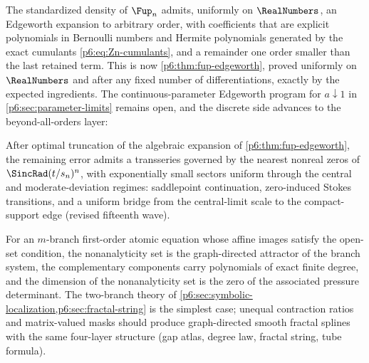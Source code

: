 \documentclass[11pt,oneside]{article}
\numberwithin{equation}{section}
\theoremstyle{definition}
\theoremstyle{remark}
\begin{document}
\begin{conjecture}
The standardized density of $\Fup_n$ admits, uniformly on $\RealNumbers$, an Edgeworth
expansion to arbitrary order, with coefficients that are explicit polynomials
in Bernoulli numbers and Hermite polynomials generated by the exact cumulants
\eqref{p6:eq:Zn-cumulants}, and a remainder one order smaller than the last
retained term.
This is now \cref{p6:thm:fup-edgeworth}, proved uniformly on $\RealNumbers$ and after
any fixed number of differentiations, exactly by the expected ingredients.
The continuous-parameter Edgeworth program for $a\downarrow1$ in
\cref{p6:sec:parameter-limits} remains open, and the discrete side advances
to the beyond-all-orders layer:
\end{conjecture}

\begin{conjecture}
After optimal truncation of the algebraic expansion of
\cref{p6:thm:fup-edgeworth}, the remaining error admits a transseries
governed by the nearest nonreal zeros of $\SincRad(t/s_n)^n$, with exponentially
small sectors uniform through the central and moderate-deviation regimes:
saddlepoint continuation, zero-induced Stokes transitions, and a uniform
bridge from the central-limit scale to the compact-support edge (revised
fifteenth wave).
\end{conjecture}

\begin{conjecture}
For an $m$-branch first-order atomic equation whose affine images satisfy the
open-set condition, the nonanalyticity set is the graph-directed attractor of
the branch system, the complementary components carry polynomials of exact
finite degree, and the dimension of the nonanalyticity set is the zero of the
associated pressure determinant.  The two-branch theory of
\cref{p6:sec:symbolic-localization,p6:sec:fractal-string} is the simplest
case; unequal contraction ratios and matrix-valued masks should produce
graph-directed smooth fractal splines with the same four-layer structure
(gap atlas, degree law, fractal string, tube formula).
\end{conjecture}
\end{document}
